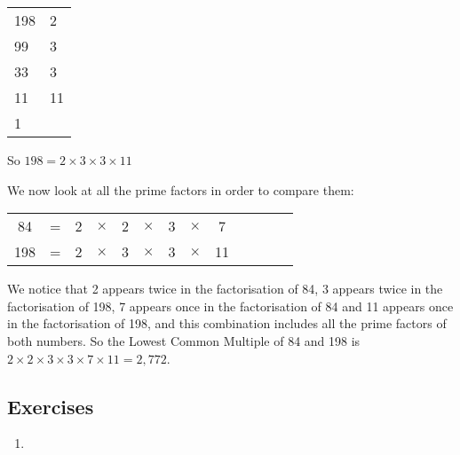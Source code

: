 \documentclass[11pt, oneside]{article}
\theoremstyle{definition}
\begin{document}
\bigbreak

\begin{tabular}{ p{0.5cm} | p{1.5cm}}
198 & 2  \\
99 & 3  \\
33 & 3  \\
11 & 11 \\
1 
\end{tabular}

So $198 = 2\times 3 \times 3 \times 11$

We now look at all the prime factors in order to compare them:

\begin{tabular}{c c c c c c c c c c c c c}
84 & = & 2 & $\times$ & 2 & $\times$ & 3 & $\times$ & 7 &  &  &  &  \\
198 & = & 2 & $\times$ & 3 & $\times$ & 3 & $\times $ & 11 &  &  &  & 
\end{tabular}

We notice that 2 appears twice in the factorisation of 84, 3 appears twice in the factorisation of 198, 7 appears once in the factorisation of 84 and 11 appears once in the factorisation of 198, and this combination includes all the prime factors of both numbers. So the Lowest Common Multiple of 84 and 198 is $2\times 2 \times 3 \times 3 \times 7 \times 11 = 2,772$.

\subsection{Exercises}
\begin{enumerate}
\item 
\end{enumerate}
\end{document}
